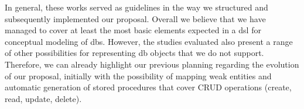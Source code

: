 In general, these works served as guidelines in the way we structured and subsequently implemented our proposal.
Overall we believe that we have managed to cover at least the most basic elements expected in a \ac{dsl} for conceptual modeling of \acp{db}.
However, the studies evaluated also present a range of other possibilities for representing \ac{db} objects that we do not support.
Therefore, we can already highlight our previous planning regarding the evolution of our proposal, initially with the possibility of mapping weak entities and automatic generation of stored procedures that cover CRUD operations (create, read, update, delete).